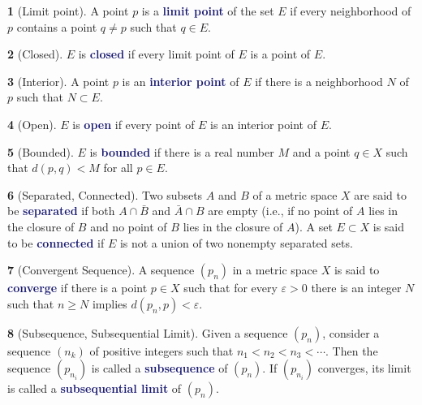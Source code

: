 \documentclass[12pt]{article}
\numberwithin{equation}{section}
\newcommand{\navy}[1]{\textcolor{MidnightBlue}{\bf #1}}
\theoremstyle{plain}
\theoremstyle{definition}
\newtheorem{definition}{\color{MidnightBlue}{\textbf{Definition}}}[section]
\newcommand{\1}{\mathbbm 1}
\newcommand{\e}{\varepsilon}
\begin{document}
\begin{definition}[Limit point]
A point $p$ is a \navy{limit point} of the set $E$ if every neighborhood of $p$ contains a point $q \neq p$ such that $q \in E$.
\end{definition}

\begin{definition}[Closed]
$E$ is \navy{closed} if every limit point of $E$ is a point of $E$.
\end{definition}

\begin{definition}[Interior]
A point $p$ is an \navy{interior point} of $E$ if there is a neighborhood $N$ of $p$ such that $N \subset E$.
\end{definition}

\begin{definition}[Open]
$E$ is \navy{open} if every point of $E$ is an interior point of $E$.
\end{definition}

\begin{definition}[Bounded]
$E$ is \navy{bounded} if there is a real number $M$ and a point $q \in X$ such that $d(p,q) < M$ for all $p \in E$.
\end{definition}

\begin{definition}[Separated, Connected]
Two subsets $A$ and $B$ of a metric space $X$ are said to be \navy{separated} if both $A \cap \bar{B}$ and $\bar{A} \cap B$ are empty (i.e., if no point of $A$ lies in the closure of $B$ and no point of $B$ lies in the closure of $A$). A set $E \subset X$ is said to be \navy{connected} if $E$ is not a union of two nonempty separated sets.
\end{definition}

\begin{definition}[Convergent Sequence]
A sequence $(p_n)$ in a metric space $X$ is said to \navy{converge} if there is a point $p \in X$ such that for every $\e > 0$ there is an integer $N$ such that $n \geq N$ implies $d(p_n,p) < \e$.
\end{definition}

\begin{definition}[Subsequence, Subsequential Limit]
Given a sequence $(p_n)$, consider a sequence $(n_k)$ of positive integers such that $n_1 < n_2 < n_3 < \cdots $. Then the sequence $(p_{n_i})$ is called a \navy{subsequence} of $(p_n)$. If $(p_{n_i})$ converges, its limit is called a \navy{subsequential limit} of $(p_n)$.
\end{definition}
\end{document}

